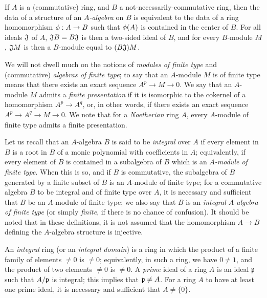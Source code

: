 \begin{env}[1.0.4]
\label{0.1.0.4}
If $A$ is a (commutative) ring, and $B$ a not-necessarily-commutative ring, then the data of a structure of an \emph{$A$-algebra} on $B$ is equivalent to the data of a ring homomorphism $\vphi:A\to B$ such that $\phi(A)$ is contained in the center of $B$.
For all ideals $\mathfrak{J}$ of $A$, $\mathfrak{J}B=B\mathfrak{J}$ is then a two-sided ideal of $B$, and for every $B$-module $M$, $\mathfrak{J}M$ is then a $B$-module equal to $(B\mathfrak{J})M$.
\end{env}

\begin{env}[1.0.5]
\label{0.1.0.5}
We will not dwell much on the notions of \emph{modules of finite type} and
(commutative) \emph{algebras of finite type};
to say that an $A$-module $M$ is of finite type means that there exists
an exact sequence $A^p\to M\to 0$.
We say that an $A$-module $M$ admits a \emph{finite presentation} if it is isomorphic to the cokernel of a homomorphism $A^p\to A^q$, or, in other words, if there exists an exact sequence $A^p\to A^q\to M\to 0$.
We note that for a \emph{Noetherian} ring $A$, every $A$-module of finite type admits a finite presentation.

Let us recall that an $A$-algebra $B$ is said to be \emph{integral} over $A$ if every element in $B$ is a root in $B$ of a monic polynomial with coefficients in $A$;
equivalently, if every element of $B$ is contained in a subalgebra of $B$ which is an \emph{$A$-module of finite type}.
When this is so, and if $B$ is commutative, the subalgebra of $B$ generated by a finite subset of $B$ is an $A$-module of finite type;
for a commutative algebra $B$ to be integral and of finite type over $A$, it is necessary and sufficient that $B$ be an $A$-module of finite type;
we also say that $B$ is an \emph{integral $A$-algebra of finite type} (or simply \emph{finite}, if there is no chance of confusion).
It should be noted that in these definitions, it is not assumed that the homomorphism $A\to B$ defining the $A$-algebra structure is injective.
\end{env}

\begin{env}[1.0.6]
\label{0.1.0.6}
An \emph{integral} ring (or an \emph{integral domain}) is a ring in which the product of a finite family of elements $\neq 0$ is $\neq 0$;
equivalently, in such a ring, we have $0\neq 1$, and the product of two elements $\neq 0$ is $\neq0$.
A \emph{prime} ideal of a ring $A$ is an ideal $\mathfrak{p}$ such that $A/\mathfrak{p}$ is integral;
this implies that $\mathfrak{p}\neq A$.
For a ring $A$ to have at least one prime ideal, it is necessary and sufficient that $A\neq\{0\}$.
\end{env}


